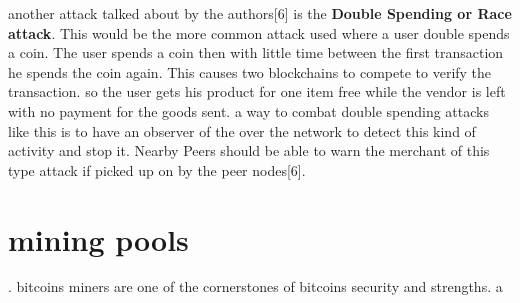 \documentclass[report]{IEEEtran}
\begin{document}
another attack talked about by the authors[6] is the \textbf{Double Spending or Race attack}. This would be the more common attack used where a user double spends a coin. The user spends a coin then with little time between the first transaction he spends the coin again. This causes two blockchains to compete to verify the transaction. so the user gets his product for one item free while the vendor is left with no payment for the goods sent. a way to combat double spending attacks like this is to have an observer of the over the network to detect this kind of activity and stop it. Nearby Peers should be able to warn the merchant of this type attack if picked up on by the peer nodes[6]. 
\section{mining pools}.\newline
 bitcoins miners are one of the cornerstones of bitcoins security and strengths. a
\end{document}
